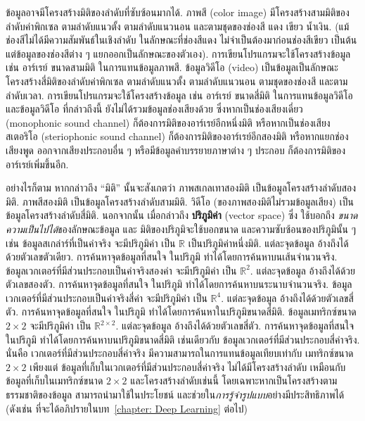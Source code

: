 ข้อมูลอาจมีโครงสร้างมิติของลำดับที่ซับซ้อนมากได้.
%
ภาพสี (color image) มีโครงสร้างสามมิติของลำดับค่าพิกเซล ตามลำดับแนวตั้ง ตามลำดับแนวนอน
และตามชุดของช่องสี แดง เขียว น้ำเงิน.
(แม้ช่องสีไม่ได้มีความสัมพันธ์ในเชิงลำดับ ในลักษณะที่ช่องสีแดง ไม่จำเป็นต้องมาก่อนช่องสีเขียว เป็นต้น
แต่ข้อมูลของช่องสีต่าง ๆ แยกออกเป็นลักษณะของตัวเอง).
การเขียนโปรแกรมจะใช้โครงสร้างข้อมูล เช่น อาร์เรย์ ขนาดสามมิติ ในการแทนข้อมูลภาพสี.
%
ข้อมูลวิดีโอ (video)
เป็นข้อมูลเป็นลักษณะโครงสร้างสี่มิติของลำดับค่าพิกเซล
ตามลำดับแนวตั้ง ตามลำดับแนวนอน
ตามชุดของช่องสี และตามลำดับเวลา.
การเขียนโปรแกรมจะใช้โครงสร้างข้อมูล เช่น อาร์เรย์ ขนาดสี่มิติ ในการแทนข้อมูลวิดีโอ
และข้อมูลวิดีโอ ที่กล่าวถึงนี้ ยังไม่ได้รวมข้อมูลช่องเสียงด้วย
ซึ่งหากเป็นช่องเสียงเดี่ยว (monophonic sound channel) ก็ต้องการมิติของอาร์เรย์อีกหนึ่งมิติ
หรือหากเป็นช่องเสียงสเตอริโอ (steriophonic sound channel) ก็ต้องการมิติของอาร์เรย์อีกสองมิติ
หรือหากแยกช่องเสียงพูด ออกจากเสียงประกอบอื่น ๆ
หรือมีข้อมูลคำบรรยายภาษาต่าง ๆ ประกอบ ก็ต้องการมิติของอาร์เรย์เพิ่มขึ้นอีก.
%

อย่างไรก็ตาม หากกล่าวถึง ``มิติ'' นั้นจะสังเกตว่า
ภาพสเกลเทาสองมิติ เป็นข้อมูลโครงสร้างลำดับสองมิติ.
ภาพสีสองมิติ เป็นข้อมูลโครงสร้างลำดับสามมิติ.
วิดีโอ (ของภาพสองมิติไม่รวมข้อมูลเสียง) %
เป็นข้อมูลโครงสร้างลำดับสี่มิติ.
%
นอกจากนั้น เมื่อกล่าวถึง \textbf{ปริภูมิค่า} (vector space)
 ซึ่ง ใช้บอกถึง \textit{ขนาดความเป็นไปได้}ของลักษณะข้อมูล
และ
มิติของปริภูมิจะใช้บอกขนาด และความซับซ้อนของปริภูมินั้น ๆ
เช่น ข้อมูลสเกล่าร์ที่เป็นค่าจริง จะมีปริภูมิค่า เป็น $\mathbb{R}$ เป็นปริภูมิค่าหนึ่งมิติ.
แต่ละจุดข้อมูล อ้างถึงได้ด้วยตัวเลขตัวเดียว.
การค้นหาจุดข้อมูลที่สนใจ ในปริภูมิ ทำได้โดยการค้นหาบนเส้นจำนวนจริง.
%
ข้อมูลเวกเตอร์ที่มีส่วนประกอบเป็นค่าจริงสองค่า จะมีปริภูมิค่า เป็น $\mathbb{R}^2$.
แต่ละจุดข้อมูล อ้างถึงได้ด้วยตัวเลขสองตัว.
การค้นหาจุดข้อมูลที่สนใจ ในปริภูมิ
ทำได้โดยการค้นหาบนระนาบจำนวนจริง.
%
ข้อมูลเวกเตอร์ที่มีส่วนประกอบเป็นค่าจริงสี่ค่า จะมีปริภูมิค่า เป็น $\mathbb{R}^4$.
แต่ละจุดข้อมูล อ้างถึงได้ด้วยตัวเลขสี่ตัว.
การค้นหาจุดข้อมูลที่สนใจ ในปริภูมิ
ทำได้โดยการค้นหาในปริภูมิขนาดสี่มิติ.
%
ข้อมูลเมทริกซ์ขนาด $2 \times 2$ จะมีปริภูมิค่า เป็น $\mathbb{R}^{2\times2}$.
แต่ละจุดข้อมูล อ้างถึงได้ด้วยตัวเลขสี่ตัว.
การค้นหาจุดข้อมูลที่สนใจ ในปริภูมิ
ทำได้โดยการค้นหาบนปริภูมิขนาดสี่มิติ 
เช่นเดียวกับ ข้อมูลเวกเตอร์ที่มีส่วนประกอบสี่ค่าจริง.
นั่นคือ เวกเตอร์ที่มีส่วนประกอบสี่ค่าจริง มีความสามารถในการแทนข้อมูลเทียบเท่ากับ
เมทริกซ์ขนาด $2 \times 2$
เพียงแต่ ข้อมูลที่เก็บในเวกเตอร์ที่มีส่วนประกอบสี่ค่าจริง
ไม่ได้มีโครงสร้างลำดับ เหมือนกับ
ข้อมูลที่เก็บในเมทริกซ์ขนาด $2 \times 2$
และโครงสร้างลำดับเช่นนี้ โดยเฉพาะหากเป็นโครงสร้างตามธรรมชาติของข้อมูล
สามารถนำมาใช้ในประโยชน์ และช่วยใน\textit{การรู้จำรูปแบบ}อย่างมีประสิทธิภาพได้ (ดังเช่น ที่จะได้อภิปรายในบท~\ref{chapter: Deep Learning} ต่อไป)
 
